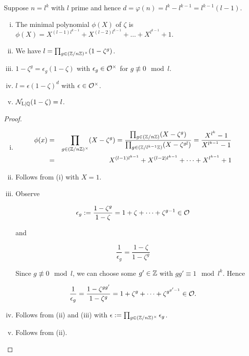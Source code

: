 \begin{Lem}
	Suppose $n = l^k$ with $l$ prime and hence $d = \varphi(n) = l^k - l^{k-1} = l^{k-1}(l-1)$.
	\begin{enumerate}[(i)]
		\item The minimal polynomial $\phi(X)$ of $\zeta$ is $\phi(X) = X^{(l-1)l^{k-1}} + X^{(l-2)l^{k-1}} + \dots + X^{l^{k-1}} + 1$.
		
		\item We have $l = \prod_{g \in (\mathbb{Z}/n\mathbb{Z})^\times} (1-\zeta^g)$.
		
		\item $1-\zeta^g = \epsilon_g(1-\zeta)$ with $\epsilon_g \in \mathcal{O}^\times$ for $g \not\equiv 0 \mod l$.
		
		\item $l = \epsilon(1-\zeta)^d$ with $\epsilon \in \mathcal{O}^\times$.
		
		\item $\operatorname{\mathcal{N}_{L \vert \mathbb{Q}}} (1-\zeta) = l$.
	\end{enumerate}
\end{Lem}
\begin{proof}
	\begin{enumerate}[(i)]
		\item 
		\begin{eqnarray*}
		\phi(x) &=& \prod_{g \in (\mathbb{Z}/n\mathbb{Z})^\times} (X - \zeta^g) = \frac{ \prod_{g \in (\mathbb{Z}/n\mathbb{Z})}(X - \zeta^g)} { \prod_{g \in (\mathbb{Z}/l^{k-1}\mathbb{Z})} (X - \zeta^{gl})} = \frac{X^{l^k} - 1}{X^{l^{k-1}}-1}\\
		&=& X^{(l-1)l^{k-1}} + X^{(l-2)l^{k-1}} + \dots + X^{l^{k-1}} + 1
		\end{eqnarray*}
	
	\item Follows from (i) with $X = 1$.
	
	\item Observe 
	
	\[ \epsilon_g := \frac{1-\zeta^g}{1-\zeta} = 1 + \zeta + \dots +\zeta^{g-1} \in \mathcal{O} \]
	
	and 
	
	\[\frac{1}{\epsilon_g} = \frac{1-\zeta}{1-\zeta^g} \]
	
	Since $g \not\equiv 0 \mod l$, we can choose some $g' \in \mathbb{Z}$ with $gg' \equiv 1 \mod l^k$. Hence
	
	\[\frac{1}{\epsilon_g} = \frac{1-\zeta^{gg'}}{1-\zeta^g} = 1 + \zeta^g + \dots + \zeta^{g^{g'-1}} \in \mathcal{O}.\]
	
	\item Follows from (ii) and (iii) with $\epsilon := \prod_{g \in (\mathbb{Z}/n\mathbb{Z})^\times}\epsilon_g$.
	
	\item Follows from (ii).
	\end{enumerate}
\end{proof}


